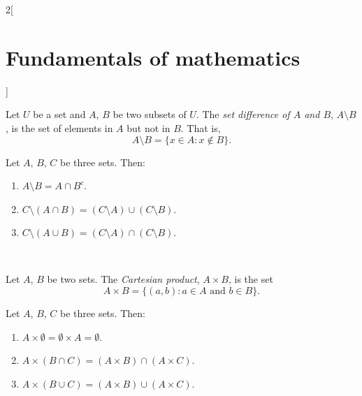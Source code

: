 \documentclass[../../../main.tex]{subfiles}
\begin{document}
\begin{multicols}{2}[\section{Fundamentals of mathematics}]
\begin{prop}
\begin{enumerate}
        \end{enumerate}
    \end{prop}
    \begin{definition}
        Let $U$ be a set and $A$, $B$ be two subsets of $U$. The \textit{set difference of $A$ and $B$}, $A\setminus B$, is the set of elements in $A$ but not in $B$. That is, $$A\setminus B=\{x\in A:x\notin B\}.$$
    \end{definition}
    \begin{prop}
        Let $A$, $B$, $C$ be three sets. Then:
        \begin{enumerate}
            \item $A\setminus B=A\cap B^c$.
            \item $C\setminus(A\cap B)=(C\setminus A)\cup (C\setminus B)$.
            \item $C\setminus(A\cup B)=(C\setminus A)\cap (C\setminus B)$.
        \end{enumerate}
    \end{prop}
    \begin{center}
        \hfill
        \\
        \vspace{0.02\linewidth}
        \hfill
        
    \end{center}
    \begin{definition}
        Let $A$, $B$ be two sets. The \textit{Cartesian product}, $A\times B$, is the set $$A\times B=\{(a,b): a\in A\text{ and }b\in B\}.$$
    \end{definition}
    \begin{prop}
        Let $A$, $B$, $C$ be three sets. Then:
        \begin{enumerate}
            \item $A\times \emptyset=\emptyset\times A=\emptyset$.
            \item $A\times(B\cap C)=(A\times B)\cap(A\times C)$.
            \item $A\times(B\cup C)=(A\times B)\cup(A\times C)$.
        \end{enumerate}
    \end{prop}

\end{multicols}
\end{document}
